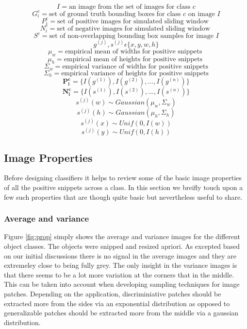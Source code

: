 \documentclass[10pt,twocolumn,letterpaper]{article}
\begin{document}
\[ I = \text{an image from the set of images for class } c \]
\[ G_i^c = \text{set of ground truth bounding boxes for class } c \text{ on image } I \]
\[ P_i^c = \text{set of positive images for simulated sliding window } \]
\[ N_i^c = \text{set of negative images for simulated sliding window } \]
\[ S^c = \text{set of non-overlapping bounding box samples for image } I \]
\[ g^{(j)} , s^{(j)} \epsilon \{ x , y , w , h \} \]
\[ \mu_w = \text{empirical mean of widths for positive snippets } \]
\[ \mu_h = \text{empirical mean of heights for positive snippets } \]
\[ \Sigma_w = \text{empirical variance of widths for positive snippets}  \]
\[ \Sigma_h = \text{empirical variance of heights for positive snippets}  \]
\[\boldsymbol{P_i^c} = \{I({g^{(1)}}),I({g^{(2)}}),\ldots,I({g^{(n)}})\}\]
\[\boldsymbol{N_i^c} = \{I({s^{(1)}}),I({s^{(2)}}),\ldots,I({s^{(n)}})\}\]
\[ {s^{(j)}}(w) \sim Gaussian( \mu_w , \Sigma_w) \]
\[ {s^{(j)}}(h) \sim Gaussian( \mu_h , \Sigma_h) \]
\[ {s^{(j)}}(x) \sim Unif( 0 , I(w) ) \]
\[ {s^{(j)}}(y) \sim Unif( 0 , I(h) ) \]





\subsection{Image Properties}

Before designing classifiers it helps to review some of the basic image properties of all the
positive snippets across a class. In this section we breifly touch upon a few such properties
that are though quite basic but nevertheless useful to share.


\subsubsection{Average and variance}

Figure \ref{fig:prop} simply shows the average and variance images for the different object classes. The objects
were snipped and resized apriori. As excepted based on our initial discussions there is no signal in the
average images and they are extremeley close to being fully grey. The only insight in the variance images
is that there seems to be a lot more variation at the corners that in the middle. This can be taken into
account when developing sampling techniques for image patches. Depending on the application, discriminiative
patches should be extracted more from the sides via an exponential distribution as opposed to generalizable
patches should be extracted more from the middle via a gaussian distribution.
\end{document}
